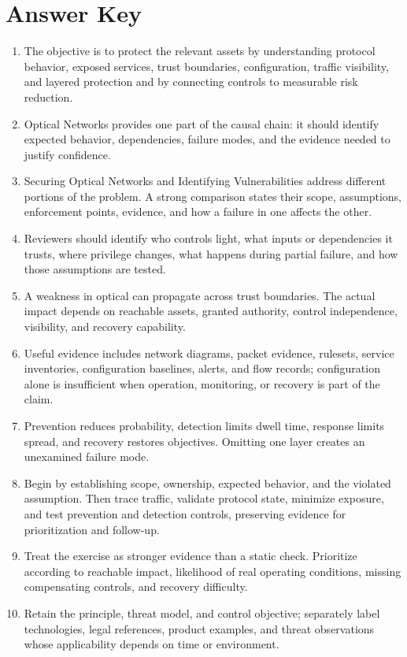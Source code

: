 \documentclass[11pt]{article}
\begin{document}
\section*{Answer Key}
\begin{enumerate}
\item The objective is to protect the relevant assets by understanding protocol behavior, exposed services, trust boundaries, configuration, traffic visibility, and layered protection and by connecting controls to measurable risk reduction.
\item Optical Networks provides one part of the causal chain: it should identify expected behavior, dependencies, failure modes, and the evidence needed to justify confidence.
\item Securing Optical Networks and Identifying Vulnerabilities address different portions of the problem. A strong comparison states their scope, assumptions, enforcement points, evidence, and how a failure in one affects the other.
\item Reviewers should identify who controls light, what inputs or dependencies it trusts, where privilege changes, what happens during partial failure, and how those assumptions are tested.
\item A weakness in optical can propagate across trust boundaries. The actual impact depends on reachable assets, granted authority, control independence, visibility, and recovery capability.
\item Useful evidence includes network diagrams, packet evidence, rulesets, service inventories, configuration baselines, alerts, and flow records; configuration alone is insufficient when operation, monitoring, or recovery is part of the claim.
\item Prevention reduces probability, detection limits dwell time, response limits spread, and recovery restores objectives. Omitting one layer creates an unexamined failure mode.
\item Begin by establishing scope, ownership, expected behavior, and the violated assumption. Then trace traffic, validate protocol state, minimize exposure, and test prevention and detection controls, preserving evidence for prioritization and follow-up.
\item Treat the exercise as stronger evidence than a static check. Prioritize according to reachable impact, likelihood of real operating conditions, missing compensating controls, and recovery difficulty.
\item Retain the principle, threat model, and control objective; separately label technologies, legal references, product examples, and threat observations whose applicability depends on time or environment.
\end{enumerate}
\end{document}
